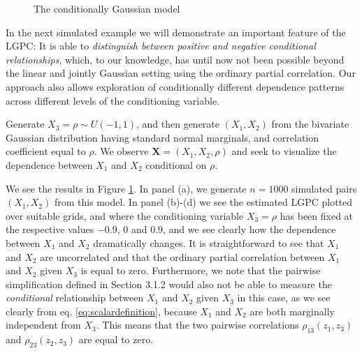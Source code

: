 \documentclass[
  12pt,
  letterpaper]{article}
\newcommand{\X}{\bm{X}}
\theoremstyle{definition}
\theoremstyle{definition}
\theoremstyle{definition}
\theoremstyle{remark}
\begin{document}
\begin{figure}[p]
    \caption{The conditionally Gaussian model}\label{fig:simex2-plots}
\end{figure}

In the next simulated example we will demonstrate an important feature of the LGPC: It is able to \emph{distinguish between positive and negative conditional relationships}, which, to our knowledge, has until now not been possible beyond the linear and jointly Gaussian setting using the ordinary partial correlation. Our approach also allows exploration of conditionally different dependence patterns across different levels of the conditioning variable.

Generate \(X_3 = \rho \sim U(-1,1)\), and then generate \((X_1, X_2)\) from the bivariate Gaussian distribution having standard normal marginals, and correlation coefficient equal to \(\rho\). We observe \(\X = (X_1, X_2, \rho)\) and seek to visualize the dependence between \(X_1\) and \(X_2\) conditional on \(\rho\).

We see the results in Figure \ref{fig:simex2-plots}. In panel (a), we generate \(n=1000\) simulated pairs \((X_1, X_2)\) from this model. In panel (b)-(d) we see the estimated LGPC plotted over suitable grids, and where the conditioning variable \(X_3 = \rho\) has been fixed at the respective values \(-0.9\), \(0\) and \(0.9\), and we see clearly how the dependence between \(X_1\) and \(X_2\) dramatically changes. It is straightforward to see that \(X_1\) and \(X_2\) are uncorrelated and that the ordinary partial correlation between \(X_1\) and \(X_2\) given \(X_3\) is equal to zero. Furthermore, we note that the pairwise simplification defined in Section 3.1.2 would also not be able to measure the \emph{conditional} relationship between \(X_1\) and \(X_2\) given \(X_3\) in this case, as we see clearly from eq. \eqref{eq:scalardefinition}, because \(X_1\) and \(X_2\) are both marginally independent from \(X_3\). This means that the two pairwise correlations \(\rho_{13}(z_1,z_3)\) and \(\rho_{23}(z_2,z_3)\) are equal to zero.
\end{document}
